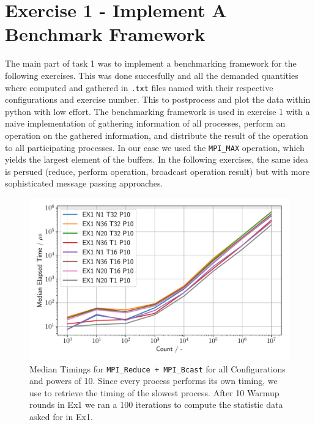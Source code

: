 \section{Exercise 1 - Implement A Benchmark Framework}

The main part of task 1 was to implement a benchmarking framework for the following exercises. This was done succesfully 
and all the demanded quantities where computed and gathered in \texttt{.txt} files named with their respective
 configurations and exercise number. This to postprocess and plot the data within python with low effort. 
 The benchmarking framework is used in exercise 1 with a naive implementation of gathering information of all processes, 
 perform an operation on the gathered information, and distribute the result of the operation to all 
 participating processes. In our case we used the \texttt{MPI\_MAX} operation, which yields the largest 
 element of the buffers. In the following exercises, the same idea is persued (reduce, perform operation, 
 broadcast operation result) but with more sophisticated message passing approaches. 


\begin{figure}[h]
    \begin{center}
        \includegraphics[width=1.0\linewidth]{figures/Ex1_1.pdf}
        \caption{Median Timings for \texttt{MPI\_Reduce + MPI\_Bcast} for all Configurations 
        and powers of 10. Since every  process performs its own timing, we use 
         to retrieve the timing of the slowest process. After 10 Warmup rounds in Ex1 we ran a 100
        iterations to compute the statistic data asked for in Ex1.}
        \label{Ex1_P10_median}
    \end{center}
\end{figure}

